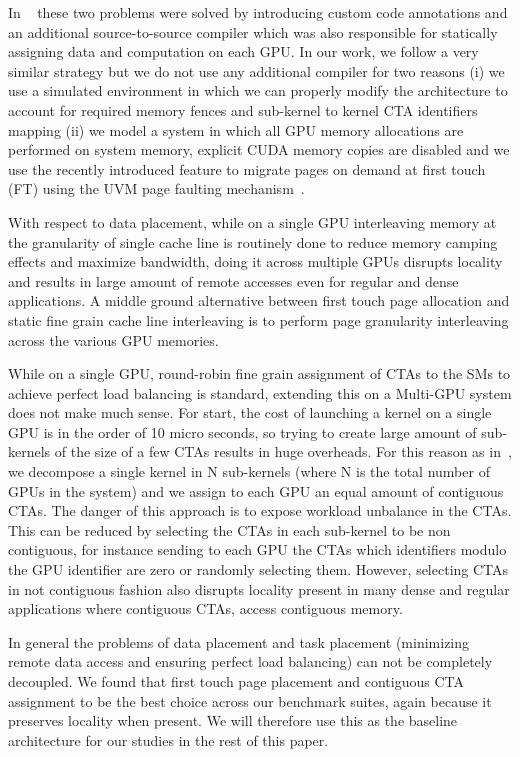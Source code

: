 In ~\cite{Cabezas2015} these two problems were solved by introducing custom 
code annotations and an additional source-to-source compiler which was also 
responsible for statically assigning data and computation on each GPU. In our 
work, we follow a very similar strategy but we do not use any additional 
compiler for two reasons (i) we use a simulated environment in which 
we can properly modify the architecture to account for required memory fences 
and sub-kernel to kernel CTA identifiers mapping (ii) we model a system in 
which all GPU memory allocations are performed on system memory, explicit 
CUDA memory copies are disabled and we use the recently introduced feature to 
migrate pages on demand at first touch (FT) using the UVM page faulting 
mechanism~\cite{P100}. 

With respect to data placement, while on a single GPU interleaving memory at 
the granularity of single cache line is routinely done to reduce memory 
camping effects and maximize bandwidth, doing it across multiple GPUs 
disrupts locality and results in large amount of remote accesses even for 
regular and dense applications. A middle ground alternative between first 
touch page allocation and static fine grain cache line interleaving is to 
perform page granularity interleaving across the various GPU memories.

While on a single GPU, round-robin fine grain assignment of CTAs to the SMs 
to achieve perfect load balancing is standard, extending this on a Multi-GPU 
system does not make much sense. For start, the cost of launching a kernel on 
a single GPU is in the order of 10 micro seconds, so trying to create large 
amount of sub-kernels of the size of a few CTAs results in huge overheads. 
For this reason as in~\cite{Cabezas2015}, we decompose a single kernel in N 
sub-kernels (where N is the total number of GPUs in the system) and we assign 
to each GPU an equal amount of contiguous CTAs. The danger of this approach 
is to expose workload unbalance in the CTAs. This can be reduced by selecting 
the CTAs in each sub-kernel to be non contiguous, for instance sending to 
each GPU the CTAs which identifiers modulo the GPU identifier are zero or 
randomly selecting them. However, selecting CTAs in not contiguous fashion
also disrupts locality present in many dense and regular applications where 
contiguous CTAs, access contiguous memory.

In general the problems of data placement and task placement (minimizing 
remote data access and ensuring perfect load balancing) can not be completely 
decoupled. We found that first touch page placement and contiguous CTA 
assignment to be the best choice across our benchmark suites, again because it 
preserves locality when present. We will therefore use this as the baseline 
architecture for our studies in the rest of this paper.

